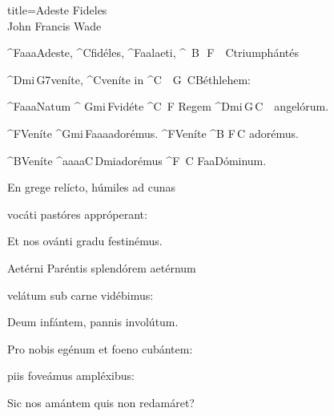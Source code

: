 \begin{song}{title=\predtitle\centering Adeste Fideles \\\large John Francis Wade \vspace*{-0.3cm}}  %
\begin{centerjustified}
\nejnejvetsi

\sloka 
	^{F{\color{white}aaa}}Adeste, ^{C}fidéles, ^{F{\color{white}aa}}laeti, ^{\,\,\,B\,\,\,\,F\,\,\,\,\,\,C}triumphántés

	^{Dmi\,G7}veníte, ^{C}veníte in ^{C\,\,\,\,\,\,G\,\,\,C}Béthlehem:

	^{F{\color{white}aaa}}Natum ^{\,\,Gmi\,F}vidéte ^{C\,\,\,F\,\,}Regem ^{Dmi\,G\,C\,\,\,\,\,\,}angelórum.
 

	^{F}Veníte ^{Gmi\,F{\color{white}aaa}}adorémus. ^{F}Veníte ^{B\,\,F\,C\,\,}adorémus.

	^{B}Veníte ^{{\color{white}aaaa}C\,Dmi}adorémus ^{F\,\,\,C\,\,F{\color{white}aa}}Dóminum.
 
 
\sloka
	En grege relícto, húmiles ad cunas
	
	vocáti pastóres appróperant:

	Et nos ovánti gradu festinémus.
 
 
 
 
\sloka
	Aetérni Paréntis splendórem aetérnum
	
	velátum sub carne vidébimus:
	
	Deum infántem, pannis involútum.
 
 
 
 
\sloka
	Pro nobis egénum et foeno cubántem:
	
	piis foveámus ampléxibus:
	
	Sic nos amántem quis non redamáret?
 
 


\end{centerjustified}

\setcounter{Slokočet}{0}
\end{song}


